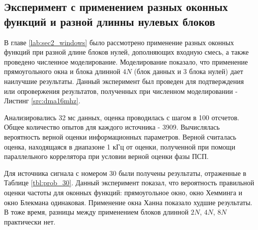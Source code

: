 {\begin{tabular}{ | c | c | c | c |}
	\end{tabular}%
} 

\subsection{Эксперимент с применением разных оконных функций и разной длинны нулевых блоков}

В главе \ref{lab:sec2_windows} было рассмотрено применение разных оконных функций при разной длине блоков нулей, дополняющих входную смесь, а также проведено численное моделирование.
Моделирование показало, что применение прямоугольного окна и блока длинной ${4N}$ (блок данных и 3 блока нулей) дает наилучшие результаты. Данный эксперимент был проведен для
подтверждения или опровержения результатов, полученных при численном моделировании - Листинг \ref{src:dma16mhz}.

Анализировались 32 мс данных, оценка проводилась с шагом в 100 отсчетов. Общее количество опытов для каждого источника - 3909. Вычислялась вероятность верной оценки информационных параметров.
Верной считалась оценка, находящаяся в диапазоне 1 кГц от оценки, полученной при помощи параллельного коррелятора при условии верной оценки фазы ПСП.

Для источника сигнала с номером 30 были получены результаты, отраженные в Таблице \ref{tbl:prob_30}. Данный эксперимент показал, что вероятность правильной оценки частоты для
оконных функций: прямоугольное окно, окно Хемминга и окно Блекмана одинаковая. Применение окна Ханна показало худшие результаты. В тоже время, разницы между применением блоков длинной ${2N}$,
${4N}$, ${8N}$ практически нет.

